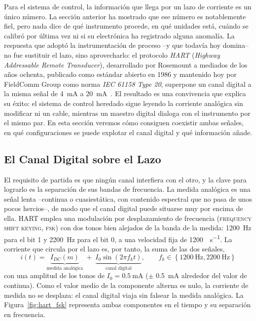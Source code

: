 Para el sistema de control, la información que llega por un lazo de corriente es un único número. La sección anterior ha mostrado que ese número es notablemente fiel, pero nada dice de qué instrumento procede, en qué unidades está, cuándo se calibró por última vez ni si su electrónica ha registrado alguna anomalía. La respuesta que adoptó la instrumentación de proceso --y que todavía hoy domina-- no fue sustituir el lazo, sino aprovecharlo: el protocolo \emph{HART} (\textit{Highway Addressable Remote Transducer}), desarrollado por Rosemount a mediados de los años ochenta, publicado como estándar abierto en 1986 y mantenido hoy por FieldComm Group como norma \emph{IEC 61158 Type 20}, superpone un canal digital a la misma señal de \SI{4}{\milli\ampere} a \SI{20}{\milli\ampere}~\cite{hart_spec_2020}. El resultado es una convivencia que explica su éxito: el sistema de control heredado sigue leyendo la corriente analógica sin modificar ni un cable, mientras un maestro digital dialoga con el instrumento por el mismo par. En esta sección veremos cómo consiguen coexistir ambas señales, en qué configuraciones se puede explotar el canal digital y qué información añade.

\subsection{El Canal Digital sobre el Lazo}\label{sub:canal_hart}

El requisito de partida es que ningún canal interfiera con el otro, y la clave para lograrlo es la separación de sus bandas de frecuencia. La medida analógica es una señal lenta --continua o cuasiestática, con contenido espectral que no pasa de unos pocos hercios--, de modo que el canal digital puede situarse muy por encima de ella. HART emplea una modulación por desplazamiento de frecuencia (\textsc{frequency shift keying, fsk}) con dos tonos bien alejados de la banda de la medida: \SI{1200}{\hertz} para el bit 1 y \SI{2200}{\hertz} para el bit 0, a una velocidad fija de \SI{1200}{\bit\per\second}. La corriente que circula por el lazo es, por tanto, la suma de las dos señales,
\begin{equation}\label{eq:hart_fsk}
    i(t) = \underbrace{I_{DC}(m)}_{\text{medida analógica}} \;+\; \underbrace{I_0 \sin\!\left(2\pi f_k t\right)}_{\text{canal digital}}, \qquad f_k \in \left\{\SI{1200}{\hertz}, \SI{2200}{\hertz}\right\}
\end{equation}
con una amplitud de los tonos de $I_0 = \SI{0.5}{\milli\ampere}$ ($\pm$ \SI{0.5}{\milli\ampere} alrededor del valor de continua). Como el valor medio de la componente alterna es nulo, la corriente de medida no se desplaza: el canal digital viaja sin falsear la medida analógica. La Figura~\ref{fig:hart_fsk} representa ambas componentes en el tiempo y su separación en frecuencia.


